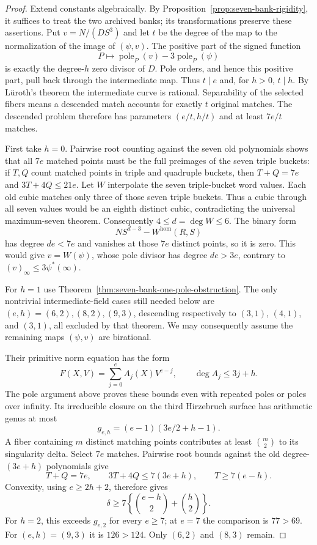 \begin{proof}
Extend constants algebraically.  By
Proposition~\ref{prop:seven-bank-rigidity}, it suffices to treat the two
archived banks; its transformations preserve these assertions.
Put $v=N/(DS^3)$ and let $t$ be the degree of the map to the
normalization of the image of $(\psi,v)$.  The positive part of the
signed function
\[
 P\longmapsto\operatorname{pole}_P(v)
              -3\operatorname{pole}_P(\psi)
\]
is exactly the degree-$h$ zero divisor of $D$.  Pole orders, and hence
this positive part, pull back through the intermediate map.  Thus
$t\mid e$ and, for $h>0$, $t\mid h$.  By L\"uroth's theorem the
intermediate curve is rational.  Separability of the selected fibers
means a descended match accounts for exactly $t$ original matches.
The descended problem therefore has parameters $(e/t,h/t)$ and at
least $7e/t$ matches.

First take $h=0$.  Pairwise root counting against the seven old
polynomials shows that all $7e$ matched points must be the full
preimages of the seven triple buckets: if $T,Q$ count matched points
in triple and quadruple buckets, then
$T+Q=7e$ and $3T+4Q\le21e$.
Let $W$ interpolate the seven triple-bucket word values.  Each old cubic matches only three of those seven triple buckets.
Thus a cubic through all seven values would be an eighth distinct
cubic, contradicting the universal maximum-seven theorem.
Consequently $4\le d=\deg W\le6$.
The binary form
\[
 N S^{d-3}-W^{\mathrm{hom}}(R,S)
\]
has degree $de<7e$ and vanishes at those $7e$ distinct points, so it is
zero.  This would give $v=W(\psi)$, whose pole divisor has degree
$de>3e$, contrary to $(v)_\infty\le3\psi^*(\infty)$.

For $h=1$ use Theorem~\ref{thm:seven-bank-one-pole-obstruction}.
The only nontrivial intermediate-field cases still needed below are
$(e,h)=(6,2),(8,2),(9,3)$, descending respectively to $(3,1)$,
$(4,1)$, and $(3,1)$, all excluded by that theorem.
We may consequently assume the remaining maps $(\psi,v)$ are
birational.

Their primitive norm equation has the form
\[
 F(X,V)=\sum_{j=0}^{e} A_j(X)V^{e-j},
 \qquad \deg A_j\le3j+h.
\]
The pole argument above proves these bounds even with repeated poles
or poles over infinity.  Its irreducible closure on the third
Hirzebruch surface has arithmetic genus at most
\[
 g_{e,h}=(e-1)(3e/2+h-1).
\]
A fiber containing $m$ distinct matching points contributes at least
$\binom m2$ to its singularity delta.  Select $7e$ matches.  Pairwise
root bounds against the old degree-$(3e+h)$ polynomials give
\[
 T+Q=7e,\qquad3T+4Q\le7(3e+h),\qquad T\ge7(e-h).
\]
Convexity, using $e\ge2h+2$, therefore gives
\[
 \delta\ge7\left\{\binom{e-h}{2}+\binom h2\right\}.
\]
For $h=2$, this exceeds $g_{e,2}$ for every $e\ge7$;
at $e=7$ the comparison is $77>69$.
For $(e,h)=(9,3)$ it is $126>124$.
Only $(6,2)$ and $(8,3)$ remain.


\end{proof}
